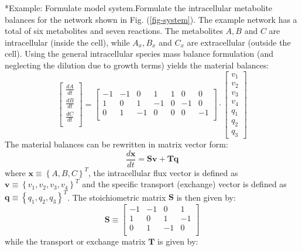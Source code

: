 \documentclass[11pt]{article}
\makeatletter
\theoremstyle{definition}
\renewcommand\subsubsection{\@startsection
	{subsubsection}{2}{0mm}
	{-0.05in}
	{-0.5\baselineskip}
	{\normalfont\normalsize\itshape}}
\makeatother
\begin{document}
\subsubsection*{Example: Formulate model system.}Formulate the intracellular metabolite balances for the network shown in Fig. (\ref{fig-system}). The example network has a total of six metabolites and seven reactions. The metabolites $A,B$ and $C$ are intracellular (inside the cell), while $A_x,B_x$ and $C_x$ are extracellular (outside the cell). Using the general intracellular species mass balance formulation (and neglecting the dilution due to growth terms) yields the material balances:
	\begin{equation}\label{eqn-full-system}
		\displaystyle\begin{bmatrix}
			\frac{dA}{dt} \\
			\frac{dB}{dt} \\
			\frac{dC}{dt} \\
		\end{bmatrix} =
		\begin{bmatrix}
			-1 & -1 & 0 & 1 & 1 & 0 & 0 \\
			1 & 0 & 1 & -1 & 0 & -1 & 0 \\
			0 & 1 & -1 & 0 & 0 & 0 & -1 \\
		\end{bmatrix}\cdot
		\begin{bmatrix}
			v_{1} \\
			v_{2} \\
			v_{3} \\
			v_{4} \\
			q_{1} \\
			q_{2} \\
			q_{3}
		\end{bmatrix}
	\end{equation}
	The material balances can be rewritten in matrix vector form:
	\begin{equation}
		\frac{d\mathbf{x}}{dt} = \mathbf{S}\mathbf{v} + \mathbf{T}\mathbf{q}
	\end{equation}where $\mathbf{x}\equiv\left\{A,B,C\right\}^{T}$, the intracellular flux vector is defined as
	$\mathbf{v} \equiv \left\{v_{1},v_{2},v_{3},v_{4}\right\}^{T}$ and the specific transport (exchange) vector is defined as $\mathbf{q} \equiv \left\{q_{1},q_{2},q_{3}\right\}^{T}$.
	The stoichiometric matrix $\mathbf{S}$ is then given by:
	\begin{equation}\nonumber
		\mathbf{S} \equiv
		\begin{bmatrix}
			-1 & -1 & 0 & 1 \\
			1 & 0 & 1 & -1 \\
			0 & 1 & -1 & 0 \\
		\end{bmatrix}
	\end{equation}while the transport or exchange matrix $\mathbf{T}$ is given by:
\end{document}
